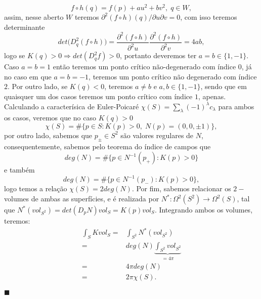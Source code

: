 \documentclass{article}
\begin{document}
	$$
	f \circ h (q) = f (p) + au^{2} + b v^{2}, \; q \in W,  
	$$
	assim, nesse aberto $W$ teremos $\partial^{2}(f\circ h)(q)/\partial u \partial v = 0$, com isso teremos  determinante 
	$$
	det \Big(D_{q}^{2}(f\circ h) \Big) = \frac{\partial^{2}(f\circ h)}{\partial^{2}u}\frac{\partial^{2}(f\circ h)}{\partial^{2}v} = 4ab,
	$$
	logo se $K(q) > 0 \Rightarrow det(D_{q}^{2}f) > 0$, portanto deveremos ter $a = b \in \{1, -1\}$. Caso $a = b = 1$ então teremos um ponto crítico não-degenerado com índice $0$, já no caso em que $a=b=-1$, teremos um ponto crítico não degenerado com índice $2$. Por outro lado, se $K(q) < 0$, teremos $a \neq b $ e $a, b \in \{1, -1\}$, sendo que em quaisquer um dos casos teremos um ponto crítico com índice $1$, apenas. Calculando a caracterísica de Euler-Poicaré $\chi(S) = \sum_{\lambda}(-1)^{\lambda}c_{\lambda}$ para ambos os casos, veremos que no caso $K(q) > 0$
	$$
	\chi(S) = \#\{p \in S: K(p)>0, \; N(p) = (0,0,\pm 1)\},
	$$
	por outro lado, sabemos que $p_{\pm} \in S^{2}$ são valores regulares de $N$, consequentemente, sabemos pelo teorema do índice de campos que
	$$
	deg(N) = \#\{p \in N^{-1}(p_{+} ): K(p)>0 \}
	$$
	e também 
	$$
	deg(N) = \#\{p \in N^{-1}(p_{-} ): K(p)>0 \},
	$$
	logo temos a relação $\chi(S) = 2 deg(N)$. Por fim, sabemos relacionar os $2-$volumes de ambas as superfícies, e é realizada por $N^{*} : \Omega^{2}(S^{2}) \to \Omega^{2}(S)$, tal que $N^{*}(vol_{S^{2}}) = det(D_{p}N)vol_{S} = K(p)vol_{S}$. Integrando ambos os volumes, teremos:
	$$
	\begin{aligned}
	\int_{S}Kvol_{S} =& \int_{S^{2}}N^{*}(vol_{S^{2}}) 
	\\
	=& deg(N) \underbrace{\int_{S^{2}}vol_{S^{2}} }_{= 4\pi}
	\\
	=& 4\pi deg(N)
	\\
	=& 2\pi \chi(S).
	\end{aligned}
	$$
	
	$\blacksquare$
\end{document}

